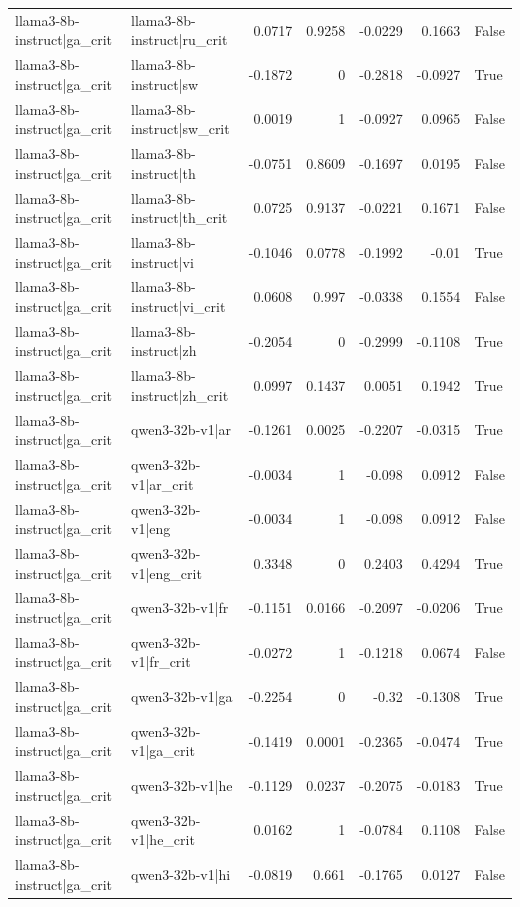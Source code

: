 \begin{table}
\begin{tabular}{l l r r r r l}
llama3-8b-instruct|ga_crit & llama3-8b-instruct|ru_crit & 0.0717 & 0.9258 & -0.0229 & 0.1663 & False \\
llama3-8b-instruct|ga_crit & llama3-8b-instruct|sw & -0.1872 & 0 & -0.2818 & -0.0927 & True \\
llama3-8b-instruct|ga_crit & llama3-8b-instruct|sw_crit & 0.0019 & 1 & -0.0927 & 0.0965 & False \\
llama3-8b-instruct|ga_crit & llama3-8b-instruct|th & -0.0751 & 0.8609 & -0.1697 & 0.0195 & False \\
llama3-8b-instruct|ga_crit & llama3-8b-instruct|th_crit & 0.0725 & 0.9137 & -0.0221 & 0.1671 & False \\
llama3-8b-instruct|ga_crit & llama3-8b-instruct|vi & -0.1046 & 0.0778 & -0.1992 & -0.01 & True \\
llama3-8b-instruct|ga_crit & llama3-8b-instruct|vi_crit & 0.0608 & 0.997 & -0.0338 & 0.1554 & False \\
llama3-8b-instruct|ga_crit & llama3-8b-instruct|zh & -0.2054 & 0 & -0.2999 & -0.1108 & True \\
llama3-8b-instruct|ga_crit & llama3-8b-instruct|zh_crit & 0.0997 & 0.1437 & 0.0051 & 0.1942 & True \\
llama3-8b-instruct|ga_crit & qwen3-32b-v1|ar & -0.1261 & 0.0025 & -0.2207 & -0.0315 & True \\
llama3-8b-instruct|ga_crit & qwen3-32b-v1|ar_crit & -0.0034 & 1 & -0.098 & 0.0912 & False \\
llama3-8b-instruct|ga_crit & qwen3-32b-v1|eng & -0.0034 & 1 & -0.098 & 0.0912 & False \\
llama3-8b-instruct|ga_crit & qwen3-32b-v1|eng_crit & 0.3348 & 0 & 0.2403 & 0.4294 & True \\
llama3-8b-instruct|ga_crit & qwen3-32b-v1|fr & -0.1151 & 0.0166 & -0.2097 & -0.0206 & True \\
llama3-8b-instruct|ga_crit & qwen3-32b-v1|fr_crit & -0.0272 & 1 & -0.1218 & 0.0674 & False \\
llama3-8b-instruct|ga_crit & qwen3-32b-v1|ga & -0.2254 & 0 & -0.32 & -0.1308 & True \\
llama3-8b-instruct|ga_crit & qwen3-32b-v1|ga_crit & -0.1419 & 0.0001 & -0.2365 & -0.0474 & True \\
llama3-8b-instruct|ga_crit & qwen3-32b-v1|he & -0.1129 & 0.0237 & -0.2075 & -0.0183 & True \\
llama3-8b-instruct|ga_crit & qwen3-32b-v1|he_crit & 0.0162 & 1 & -0.0784 & 0.1108 & False \\
llama3-8b-instruct|ga_crit & qwen3-32b-v1|hi & -0.0819 & 0.661 & -0.1765 & 0.0127 & False \\

\end{tabular}
\end{table}
